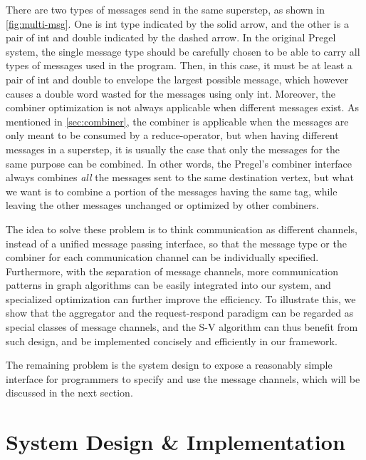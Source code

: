 \documentclass{sokendai_thesis} %
\begin{document}
There are two types of messages send in the same superstep, as shown in \autoref{fig:multi-msg}.
One is int type indicated by the solid arrow, and the other is a pair of int and double indicated by the dashed arrow.
In the original Pregel system, the single message type should be carefully chosen to be able to carry all types of messages used in the program.
Then, in this case, it must be at least a pair of int and double to envelope the largest possible message, which however causes a double word wasted for the messages using only int.
Moreover, the combiner optimization is not always applicable when different messages exist.
As mentioned in \autoref{sec:combiner}, the combiner is applicable when the messages are only meant to be consumed by a reduce-operator,
but when having different messages in a superstep, it is usually the case that only the messages for the same purpose can be combined.
In other words, the Pregel's combiner interface always combines \emph{all} the messages sent to the same destination vertex, but what we want is to combine a portion of the messages having the same tag, while leaving the other messages unchanged or optimized by other combiners.

The idea to solve these problem is to think communication as different channels, instead of a unified message passing interface, so that the message type or the combiner for each communication channel can be individually specified.
Furthermore, with the separation of message channels, more communication patterns in graph algorithms can be easily integrated into our system, and specialized optimization can further improve the efficiency.
To illustrate this, we show that the aggregator and the request-respond paradigm \cite{effective} can be regarded as special classes of message channels, and the S-V algorithm can thus benefit from such design, and be implemented concisely and efficiently in our framework.

The remaining problem is the system design to expose a reasonably simple interface for programmers to specify and use the message channels, which will be discussed in the next section.

\section{System Design \& Implementation}
\end{document}
